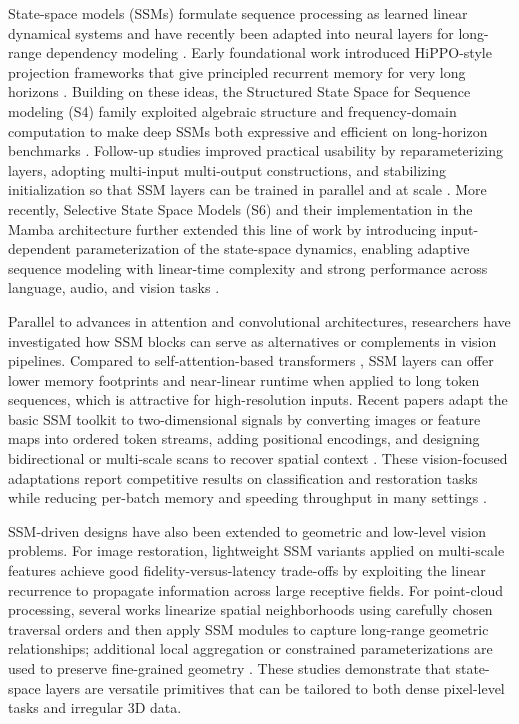 State-space models (SSMs) formulate sequence processing as learned linear dynamical systems and have recently been adapted into neural layers for long-range dependency modeling \cite{gu2020hippo,gu2021efficiently,gu2021combining,gu2022parameterization,smith2022simplified}.  Early foundational work introduced HiPPO-style projection frameworks that give principled recurrent memory for very long horizons \cite{gu2020hippo}.  Building on these ideas, the Structured State Space for Sequence modeling (S4) family exploited algebraic structure and frequency-domain computation to make deep SSMs both expressive and efficient on long-horizon benchmarks \cite{gu2021efficiently}. Follow-up studies improved practical usability by reparameterizing layers, adopting multi-input multi-output constructions, and stabilizing initialization so that SSM layers can be trained in parallel and at scale \cite{gu2021combining,gu2022parameterization,smith2022simplified}. More recently, Selective State Space Models (S6) and their implementation in the Mamba architecture further extended this line of work by introducing input-dependent parameterization of the state-space dynamics, enabling adaptive sequence modeling with linear-time complexity and strong performance across language, audio, and vision tasks \cite{gu2023mamba}.

Parallel to advances in attention and convolutional architectures, researchers have investigated how SSM blocks can serve as alternatives or complements in vision pipelines. Compared to self-attention-based transformers \cite{vaswani2017attention}, SSM layers can offer lower memory footprints and near-linear runtime when applied to long token sequences, which is attractive for high-resolution inputs.  Recent papers adapt the basic SSM toolkit to two-dimensional signals by converting images or feature maps into ordered token streams, adding positional encodings, and designing bidirectional or multi-scale scans to recover spatial context \cite{zhu2024vision,liu2024vmamba,guo2024mambair}.  These vision-focused adaptations report competitive results on classification and restoration tasks while reducing per-batch memory and speeding throughput in many settings \cite{zhu2024vision,liu2024vmamba,guo2024mambair}.

SSM-driven designs have also been extended to geometric and low-level vision problems.  For image restoration, lightweight SSM variants applied on multi-scale features achieve good fidelity-versus-latency trade-offs by exploiting the linear recurrence to propagate information across large receptive fields.  For point-cloud processing, several works linearize spatial neighborhoods using carefully chosen traversal orders and then apply SSM modules to capture long-range geometric relationships; additional local aggregation or constrained parameterizations are used to preserve fine-grained geometry \cite{liang2024pointmamba,han2024mamba3d,zha2024lcm}.  These studies demonstrate that state-space layers are versatile primitives that can be tailored to both dense pixel-level tasks and irregular 3D data.


